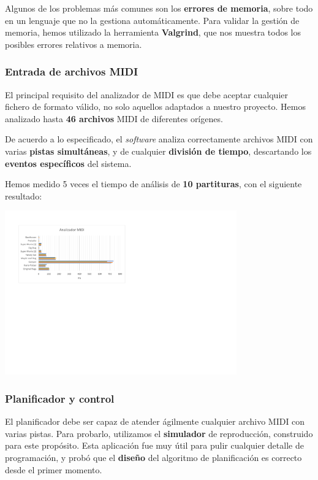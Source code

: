 \documentclass[10pt,a4paper]{article}
\begin{document}
	Algunos de los problemas más comunes son los \textbf{errores de memoria}, sobre todo en un lenguaje que no la gestiona automáticamente. Para validar la gestión de memoria, hemos utilizado la herramienta \textbf{Valgrind}, que nos muestra todos los posibles errores relativos a memoria.
	
	\subsubsection*{Entrada de archivos MIDI}
	
	El principal requisito del analizador de MIDI es que debe aceptar cualquier fichero de formato válido, no solo aquellos adaptados a nuestro proyecto. Hemos analizado hasta \textbf{46 archivos} MIDI de diferentes orígenes.
	
	De acuerdo a lo especificado, el \textit{software} analiza correctamente archivos MIDI con varias \textbf{pistas simultáneas}, y de cualquier \textbf{división de tiempo}, descartando los \textbf{eventos específicos} del sistema.
	
	Hemos medido 5 veces el tiempo de análisis de \textbf{10 partituras}, con el siguiente resultado:
	
	\begin{center}
		\includegraphics[width=0.75\textwidth]{images/lat_midi} 
	\end{center}
	
	\subsubsection*{Planificador y control}
	
	El planificador debe ser capaz de atender ágilmente cualquier archivo MIDI con varias pistas. Para probarlo, utilizamos el \textbf{simulador} de reproducción, construido para este propósito. Esta aplicación fue muy útil para pulir cualquier detalle de programación, y probó que el \textbf{diseño} del algoritmo de planificación es correcto desde el primer momento.
	
\end{document}
